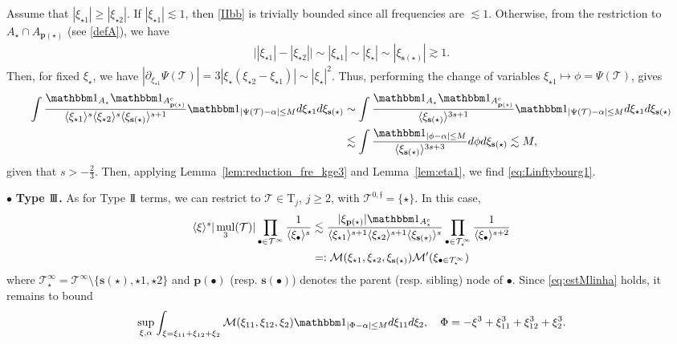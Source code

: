 \documentclass[%
11pt,  reqno]{amsart}
\newcommand{\II}{\textup{I \hspace{-2.9mm} I} }
\newcommand{\III}{\textup{I \hspace{-2.9mm} I \hspace{-2.9mm} I}}
\newcommand{\5}{\textup{V}}
\newcommand{\noi}{\noindent}
\newcommand{\ind}{\mathbbm 1}
\newcommand{\les}{\lesssim}
\theoremstyle{remark}
\newcommand{\bul}{\bullet}
\newcommand{\TT}{\mathcal{T}}
\newcommand{\Tr}{\mathrm{T}}
\newcommand{\al}{\alpha}
\newcommand{\pb}{\mathbf{p}}
\newcommand{\sbf}{\mathbf{s}}
\newcommand{\ges}{\gtrsim}
\newcommand{\jb}[1]
{\langle #1 \rangle}
\newcommand{\ff}{\mathfrak{f}}
\DeclareMathOperator{\mul}{mul}
\numberwithin{equation}{section}
\numberwithin{theorem}{section}
\begin{document}
Assume that
$|\xi_{\star1} | \ge |\xi_{\star2}|$.
If $|\xi_{\star1}| \les 1$, then  \eqref{IIbb} is trivially bounded since all frequencies are $\les 1$. Otherwise, from the restriction to $A_\star\cap A_{\pb(\star)}$ (see \eqref{defA}), we have 
\begin{align}
\big| |\xi_{\star1} |  - |\xi_{\star2}| \big| \sim |\xi_{\star1}| \sim |\xi_\star| \sim |\xi_{\sbf(\star)}| \ges 1. 
\end{align}
Then, for fixed $\xi_\star$, we have $|\partial_{\xi_{\star1}} \Psi(\TT) | = 3| \xi_\star  (\xi_{\star2} - \xi_{\star1})| \sim |\xi_{\star}|^2$. Thus, performing the change of variables $\xi_{\star1} \mapsto \phi = \Psi(\TT)$, gives
\begin{align}\label{IIb}
\begin{split}
\int \frac{\ind_{A_\star} \ind_{A^c_{\pb(\star)}}}{ \jb{\xi_{\star1} }^s \jb{\xi_{\star2}}^s \jb{\xi_{\sbf(\star)}}^{s+1}  } \ind_{|\Psi(\TT) - \al| \le M} d\xi_{\star1} d\xi_{\sbf(\star)}
&
\sim
\int \frac{\ind_{A_\star} \ind_{A^c_{\pb(\star)}}}{ \jb{\xi_{\sbf(\star)}}^{3s+1}  } \ind_{|\Psi(\TT) - \al| \le M} d\xi_{\star1} d\xi_{\sbf(\star)}
\\
&
\les 
\int \frac{\ind_{|\phi - \al| \le M} }{ \jb{\xi_{\sbf(\star)}}^{3s+3}  } d\phi d\xi_{\sbf(\star)} \les M,
\end{split}
\end{align}
given that $s>-\frac23$. 
Then, applying Lemma~\ref{lem:reduction_fre_kge3} and Lemma~\ref{lem:eta1}, we find \eqref{eq:Linftybourg1}.







\smallskip 

\noi
$\bul$ \textbf{Type $\III$.} As for Type $\II$ terms, we can restrict to $\TT\in \Tr_j$, $j\ge 2$,  with $\TT^{0,\ff}=\{\star\}$. In this case,
\begin{align}
    \jb{\xi}^s | \mul_3 (\TT)| 
    \prod_{\bul \in \TT^\infty} \frac{1}{\jb{\xi_\bul}^s}
    &
    \les 
    \frac{ |\xi_{\pb(\star)}|  \ind_{A_\star^c} }{ \jb{\xi_{\star1}}^{s+1} \jb{\xi_{\star2}}^{s+1} \jb{\xi_{\sbf(\star)}}^s} \prod_{\bul \in \TT^\infty_\star} \frac{1}{\jb{\xi_\bul}^{s+2}}\\&=:\mathcal{M}(\xi_{\star1}, \xi_{\star2}, \xi_{\sbf(\star)})\mathcal{M}'(\xi_{\bul\in \TT^\infty_\star}) 
\end{align}
where $\TT_\star^\infty=\TT^\infty\setminus\{\sbf(\star),\star1,\star2\}$ and $\pb(\bul)$ (resp. $\sbf(\bul)$) denotes the parent (resp. sibling) node of $\bul$. Since \eqref{eq:estMlinha} holds, it remains to bound
\begin{align}
\label{IIIbb}
\sup_{\xi, \alpha}
\int_{\xi=\xi_{11}+\xi_{12}+\xi_2} \mathcal{M}(\xi_{11}, \xi_{12}, \xi_{2})\ind_{|\Phi - \al| \le M} d\xi_{11} d\xi_{2},\quad \Phi=-\xi^3+\xi_{11}^3+\xi_{12}^3+\xi_2^3.
\end{align}
\end{document}
